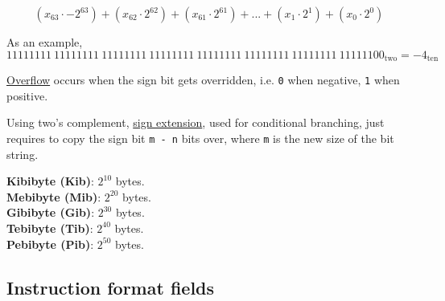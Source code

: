 \documentclass[11pt]{article}
\begin{document}
\vspace{-1em}
$$(x_{63} \cdot -2^{63})+(x_{62} \cdot 2^{62})+(x_{61} \cdot 2^{61})+...+(x_{1} \cdot 2^{1})+(x_{0} \cdot 2^{0})$$

As an example,
\vspace{-1em}
$$11111111 \ 11111111 \ 11111111 \ 11111111 \ 11111111 \ 11111111 \ 11111111 \ 11111100_{\text{two}}=-4_{\text{ten}}$$

\underline{Overflow} occurs when the sign bit gets overridden, i.e. \texttt{0} when negative, \texttt{1} when positive.

Using two's complement, \underline{sign extension}, used for conditional branching, just requires to copy the sign bit \texttt{m - n} bits over, where \texttt{m} is the new size of the bit string.

\begin{tcolorbox}[
    enhanced,
    attach boxed title to top left={xshift=6mm,yshift=-1.5mm},
    colback=moonstoneblue!20,
    colframe=moonstoneblue,
    colbacktitle=moonstoneblue,
    title=Power of 2 prefix definitions,
    fonttitle=\bfseries\color{white},
    boxed title style={size=small,colframe=moonstoneblue,sharp corners},
    sharp corners,
    label=box:logic-types,
]
    {\color{moondark}\textbf{Kibibyte (Kib)}}: $2^{10}$ bytes. \\
    {\color{moondark}\textbf{Mebibyte (Mib)}}: $2^{20}$ bytes. \\
    {\color{moondark}\textbf{Gibibyte (Gib)}}: $2^{30}$ bytes. \\
    {\color{moondark}\textbf{Tebibyte (Tib)}}: $2^{40}$ bytes. \\
    {\color{moondark}\textbf{Pebibyte (Pib)}}: $2^{50}$ bytes.
\end{tcolorbox}

\pagebreak

\subsection*{Instruction format fields}
\end{document}
